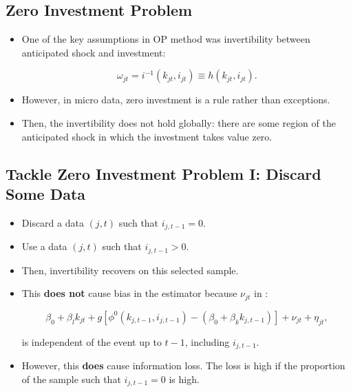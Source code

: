 \documentclass[]{book}
\providecommand{\tightlist}{%
  \setlength{\itemsep}{0pt}\setlength{\parskip}{0pt}}
\theoremstyle{definition}
\theoremstyle{definition}
\theoremstyle{definition}
\theoremstyle{remark}
\begin{document}
\subsection{Zero Investment Problem}\label{zero-investment-problem}

\begin{itemize}
\tightlist
\item
  One of the key assumptions in OP method was invertibility between
  anticipated shock and investment:

  \begin{equation}
  \omega_{jt} = i^{-1}(k_{jt}, i_{jt}) \equiv h(k_{jt}, i_{jt}).
  \end{equation}
\item
  However, in micro data, zero investment is a rule rather than
  exceptions.
\item
  Then, the invertibility does not hold globally: there are some region
  of the anticipated shock in which the investment takes value zero.
\end{itemize}

\subsection{Tackle Zero Investment Problem I: Discard Some
Data}\label{tackle-zero-investment-problem-i-discard-some-data}

\begin{itemize}
\tightlist
\item
  Discard a data \((j, t)\) such that \(i_{j, t - 1} = 0\).
\item
  Use a data \((j, t)\) such that \(i_{j, t - 1} > 0\).
\item
  Then, invertibility recovers on this selected sample.
\item
  This \textbf{does not} cause bias in the estimator because
  \(\nu_{jt}\) in :

  \begin{equation}
  \beta_0 + \beta_l k_{jt} + g[\phi^0(k_{j, t - 1}, i_{j, t - 1}) - (\beta_0 + \beta_k k_{j, t - 1})] + \nu_{jt} + \eta_{jt},
  \end{equation}

  is independent of the event up to \(t - 1\), including
  \(i_{j, t - 1}\).
\item
  However, this \textbf{does} cause information loss. The loss is high
  if the proportion of the sample such that \(i_{j, t - 1} = 0\) is
  high.
\end{itemize}
\end{document}
